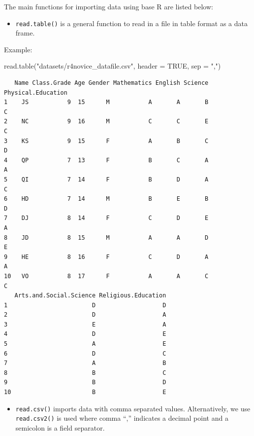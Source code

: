 \documentclass[
  letterpaper,
  DIV=11,
  numbers=noendperiod]{scrreprt}
\newenvironment{Shaded}{\begin{snugshade}}{\end{snugshade}}
\newcommand{\AttributeTok}[1]{\textcolor[rgb]{0.40,0.45,0.13}{#1}}
\newcommand{\ConstantTok}[1]{\textcolor[rgb]{0.56,0.35,0.01}{#1}}
\newcommand{\FunctionTok}[1]{\textcolor[rgb]{0.28,0.35,0.67}{#1}}
\newcommand{\NormalTok}[1]{\textcolor[rgb]{0.00,0.23,0.31}{#1}}
\newcommand{\StringTok}[1]{\textcolor[rgb]{0.13,0.47,0.30}{#1}}
\providecommand{\tightlist}{%
  \setlength{\itemsep}{0pt}\setlength{\parskip}{0pt}}\usepackage{longtable,booktabs,array}
\begin{document}
The main functions for importing data using base R are listed below:

\begin{itemize}
\tightlist
\item
  \texttt{read.table()} is a general function to read in a file in table
  format as a data frame.
\end{itemize}

Example:

\begin{Shaded}
\begin{Highlighting}[]
\FunctionTok{read.table}\NormalTok{(}\StringTok{"datasets/r4novice\_datafile.csv"}\NormalTok{, }\AttributeTok{header =} \ConstantTok{TRUE}\NormalTok{, }\AttributeTok{sep =} \StringTok{","}\NormalTok{)}
\end{Highlighting}
\end{Shaded}

\begin{verbatim}
   Name Class.Grade Age Gender Mathematics English Science Physical.Education
1    JS           9  15      M           A       A       B                  C
2    NC           9  16      M           C       C       E                  C
3    KS           9  15      F           A       B       C                  D
4    QP           7  13      F           B       C       A                  A
5    QI           7  14      F           B       D       A                  C
6    HD           7  14      M           B       E       B                  D
7    DJ           8  14      F           C       D       E                  A
8    JD           8  15      M           A       A       D                  E
9    HE           8  16      F           C       D       A                  A
10   VO           8  17      F           A       A       C                  C
   Arts.and.Social.Science Religious.Education
1                        D                   D
2                        D                   A
3                        E                   A
4                        D                   E
5                        A                   E
6                        D                   C
7                        A                   B
8                        B                   C
9                        B                   D
10                       B                   E
\end{verbatim}

\begin{itemize}
\tightlist
\item
  \texttt{read.csv()} imports data with comma separated values.
  Alternatively, we use \texttt{read.csv2()} is used where comma ``,''
  indicates a decimal point and a semicolon is a field separator.
\end{itemize}
\end{document}
